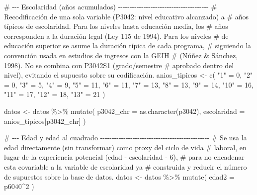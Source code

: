 \documentclass[
  spanish,
  letterpaper,
  DIV=11,
  numbers=noendperiod]{scrartcl}
\newenvironment{Shaded}{\begin{snugshade}}{\end{snugshade}}
\newcommand{\AttributeTok}[1]{\textcolor[rgb]{0.40,0.45,0.13}{#1}}
\newcommand{\CommentTok}[1]{\textcolor[rgb]{0.37,0.37,0.37}{#1}}
\newcommand{\DecValTok}[1]{\textcolor[rgb]{0.68,0.00,0.00}{#1}}
\newcommand{\FunctionTok}[1]{\textcolor[rgb]{0.28,0.35,0.67}{#1}}
\newcommand{\NormalTok}[1]{\textcolor[rgb]{0.00,0.23,0.31}{#1}}
\newcommand{\OtherTok}[1]{\textcolor[rgb]{0.00,0.23,0.31}{#1}}
\newcommand{\SpecialCharTok}[1]{\textcolor[rgb]{0.37,0.37,0.37}{#1}}
\newcommand{\StringTok}[1]{\textcolor[rgb]{0.13,0.47,0.30}{#1}}
\begin{document}
\begin{Shaded}
\begin{Highlighting}[]
\CommentTok{\# {-}{-}{-} Escolaridad (años acumulados) {-}{-}{-}{-}{-}{-}{-}{-}{-}{-}{-}{-}{-}{-}{-}{-}{-}{-}{-}{-}{-}{-}{-}{-}{-}{-}{-}{-}{-}{-}{-}{-}{-}{-}{-}{-}{-}{-}{-}}
\CommentTok{\# Recodificación de una sola variable (P3042: nivel educativo alcanzado) a}
\CommentTok{\# años típicos de escolaridad. Para los niveles hasta educación media, los}
\CommentTok{\# años corresponden a la duración legal (Ley 115 de 1994). Para los niveles}
\CommentTok{\# de educación superior se asume la duración típica de cada programa,}
\CommentTok{\# siguiendo la convención usada en estudios de ingresos con la GEIH}
\CommentTok{\# (Núñez \& Sánchez, 1998). No se combina con P3042S1 (grado/semestre}
\CommentTok{\# aprobado dentro del nivel), evitando el supuesto sobre su codificación.}
\NormalTok{anios\_tipicos }\OtherTok{\textless{}{-}} \FunctionTok{c}\NormalTok{(}
  \StringTok{"1"} \OtherTok{=} \DecValTok{0}\NormalTok{,  }\StringTok{"2"} \OtherTok{=} \DecValTok{0}\NormalTok{,  }\StringTok{"3"} \OtherTok{=} \DecValTok{5}\NormalTok{,  }\StringTok{"4"} \OtherTok{=} \DecValTok{9}\NormalTok{,  }\StringTok{"5"} \OtherTok{=} \DecValTok{11}\NormalTok{, }\StringTok{"6"} \OtherTok{=} \DecValTok{11}\NormalTok{,}
  \StringTok{"7"} \OtherTok{=} \DecValTok{13}\NormalTok{, }\StringTok{"8"} \OtherTok{=} \DecValTok{13}\NormalTok{, }\StringTok{"9"} \OtherTok{=} \DecValTok{14}\NormalTok{, }\StringTok{"10"} \OtherTok{=} \DecValTok{16}\NormalTok{, }\StringTok{"11"} \OtherTok{=} \DecValTok{17}\NormalTok{, }\StringTok{"12"} \OtherTok{=} \DecValTok{18}\NormalTok{, }\StringTok{"13"} \OtherTok{=} \DecValTok{21}
\NormalTok{)}

\NormalTok{datos }\OtherTok{\textless{}{-}}\NormalTok{ datos }\SpecialCharTok{\%\textgreater{}\%}
  \FunctionTok{mutate}\NormalTok{(}
    \AttributeTok{p3042\_chr   =} \FunctionTok{as.character}\NormalTok{(p3042),}
    \AttributeTok{escolaridad =}\NormalTok{ anios\_tipicos[p3042\_chr]}
\NormalTok{  )}

\CommentTok{\# {-}{-}{-} Edad y edad al cuadrado {-}{-}{-}{-}{-}{-}{-}{-}{-}{-}{-}{-}{-}{-}{-}{-}{-}{-}{-}{-}{-}{-}{-}{-}{-}{-}{-}{-}{-}{-}{-}{-}{-}{-}{-}{-}{-}{-}{-}{-}{-}{-}{-}{-}{-}{-}{-}}
\CommentTok{\# Se usa la edad directamente (sin transformar) como proxy del ciclo de vida}
\CommentTok{\# laboral, en lugar de la experiencia potencial (edad {-} escolaridad {-} 6),}
\CommentTok{\# para no encadenar esta covariable a la variable de escolaridad ya}
\CommentTok{\# construida y reducir el número de supuestos sobre la base de datos.}
\NormalTok{datos }\OtherTok{\textless{}{-}}\NormalTok{ datos }\SpecialCharTok{\%\textgreater{}\%}
  \FunctionTok{mutate}\NormalTok{(}
    \AttributeTok{edad2 =}\NormalTok{ p6040}\SpecialCharTok{\^{}}\DecValTok{2}
\NormalTok{  )}


\end{Highlighting}
\end{Shaded}
\end{document}
